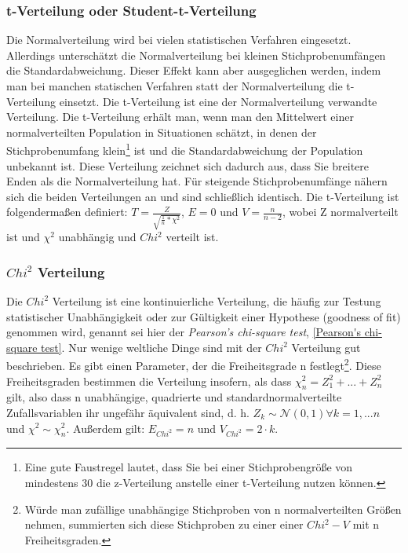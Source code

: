 \documentclass[letterpaper, titlepage]{article}
\begin{document}
\subsubsection{t-Verteilung oder Student-t-Verteilung}\label{t-Verteilung oder Student-t-Verteilung}
Die Normalverteilung wird bei vielen statistischen Verfahren eingesetzt. Allerdings unterschätzt die Normalverteilung bei kleinen Stichprobenumfängen die Standardabweichung. Dieser Effekt kann aber ausgeglichen werden, indem man bei manchen statischen Verfahren statt der Normalverteilung die t-Verteilung einsetzt. Die t-Verteilung ist eine der Normalverteilung verwandte Verteilung. Die t-Verteilung erhält man, wenn man den Mittelwert einer normalverteilten Population in Situationen schätzt, in denen der Stichprobenumfang klein\footnote{Eine gute Faustregel lautet, dass Sie bei einer Stichprobengröße von mindestens 30 die z-Verteilung anstelle einer t-Verteilung nutzen können.} ist und die Standardabweichung der Population unbekannt ist. Diese Verteilung zeichnet sich dadurch aus, dass Sie breitere Enden als die Normalverteilung hat. Für steigende Stichprobenumfänge nähern sich die beiden Verteilungen an und sind schließlich identisch. Die t-Verteilung ist folgendermaßen definiert: $T=\frac{Z}{\sqrt{\frac{1}{n}*\chi^2}}$, $E=0$ und $V=\frac{n}{n-2}$, wobei Z normalverteilt ist und $\chi^2$ unabhängig und \textit{$Chi^2$} verteilt ist.

\vspace{0.35cm}

\subsubsection{\textbf{$Chi^2$} Verteilung}\label{Chi Quadrat Verteilung}
Die $Chi^2$ Verteilung ist eine kontinuierliche Verteilung, die häufig zur Testung statistischer Unabhängigkeit oder zur Gültigkeit einer Hypothese (goodness of fit) genommen wird, genannt sei hier der \textit{Pearson's chi-square test}, \ref{Pearson's chi-square test}. Nur wenige weltliche Dinge sind mit der $Chi^2$ Verteilung gut beschrieben. Es gibt einen Parameter, der die Freiheitsgrade n festlegt\footnote{Würde man zufällige unabhängige Stichproben von n normalverteilten Größen nehmen, summierten sich diese Stichproben zu einer einer $Chi^2-V$ mit n Freiheitsgraden.}. Diese Freiheitsgraden bestimmen die Verteilung insofern, als dass $\chi_n^2=Z_1^2+...+Z_n^2$ gilt, also dass n unabhängige, quadrierte und standardnormalverteilte Zufallsvariablen ihr ungefähr äquivalent sind, d. h. $Z_k\sim \mathcal{N} (0,1) \forall k=1,...n$ und $\chi^2\sim\chi_n^2$. Außerdem gilt: $E_{Chi^2}=n$ und $V_{Chi^2}=2\cdot k$. 
\end{document}
